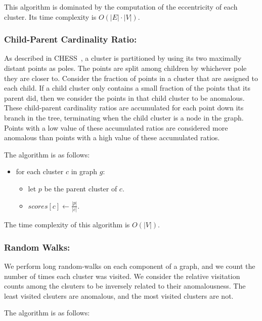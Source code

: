 This algorithm is dominated by the computation of the eccentricity of each cluster.
Its time complexity is $O(|E| \cdot |V|)$.

\subsubsection{Child-Parent Cardinality Ratio:}
As described in CHESS~\cite{ishaq2019clustered}, a cluster is partitioned by using its two maximally distant points as poles.
The points are split among children by whichever pole they are closer to.
Consider the fraction of points in a cluster that are assigned to each child.
If a child cluster only contains a small fraction of the points that its parent did, then we consider the points in that child cluster to be anomalous.
These child-parent cardinality ratios are accumulated for each point down its branch in the tree, terminating when the child cluster is a node in the graph.
Points with a low value of these accumulated ratios are considered more anomalous than points with a high value of these accumulated ratios.

The algorithm is as follows:

\begin{itemize}
    \item for each cluster $c$ in graph $g$:
    \begin{itemize}
        \item let $p$ be the parent cluster of $c$.
        \item $scores[c] \leftarrow \frac{|p|}{|c|}$.
    \end{itemize}
\end{itemize}

The time complexity of this algorithm is $O(|V|)$.


\subsubsection{Random Walks:}
We perform long random-walks on each component of a graph, and we count the number of times each cluster was visited.
We consider the relative visitation counts among the clsuters to be inversely related to their anomalousness.
The least visited clsuters are anomalous, and the most visited clusters are not.

The algorithm is as follows:

